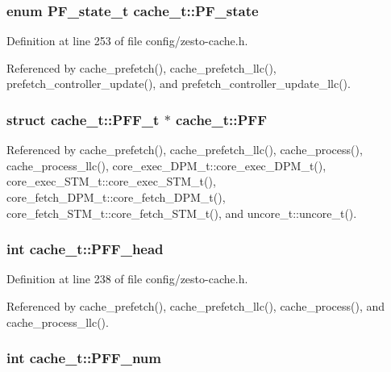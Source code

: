 \subsubsection[{PF\_\-state}]{\setlength{\rightskip}{0pt plus 5cm}enum {\bf PF\_\-state\_\-t} {\bf cache\_\-t::PF\_\-state}}\label{structcache__t_cc19e4a6e5ac1d8b3033798656bc0c2b}




Definition at line 253 of file config/zesto-cache.h.

Referenced by cache\_\-prefetch(), cache\_\-prefetch\_\-llc(), prefetch\_\-controller\_\-update(), and prefetch\_\-controller\_\-update\_\-llc().
\subsubsection[{PFF}]{\setlength{\rightskip}{0pt plus 5cm}struct {\bf cache\_\-t::PFF\_\-t} $\ast$ {\bf cache\_\-t::PFF}}\label{structcache__t_092432a8d25be05db21f421f873f3781}




Referenced by cache\_\-prefetch(), cache\_\-prefetch\_\-llc(), cache\_\-process(), cache\_\-process\_\-llc(), core\_\-exec\_\-DPM\_\-t::core\_\-exec\_\-DPM\_\-t(), core\_\-exec\_\-STM\_\-t::core\_\-exec\_\-STM\_\-t(), core\_\-fetch\_\-DPM\_\-t::core\_\-fetch\_\-DPM\_\-t(), core\_\-fetch\_\-STM\_\-t::core\_\-fetch\_\-STM\_\-t(), and uncore\_\-t::uncore\_\-t().
\subsubsection[{PFF\_\-head}]{\setlength{\rightskip}{0pt plus 5cm}int {\bf cache\_\-t::PFF\_\-head}}\label{structcache__t_9bd1c1f1c8b1e68d49f9c6ca1abc46e1}




Definition at line 238 of file config/zesto-cache.h.

Referenced by cache\_\-prefetch(), cache\_\-prefetch\_\-llc(), cache\_\-process(), and cache\_\-process\_\-llc().
\subsubsection[{PFF\_\-num}]{\setlength{\rightskip}{0pt plus 5cm}int {\bf cache\_\-t::PFF\_\-num}}\label{structcache__t_b89dcb88fdf7513473367a14f8efaad5}




